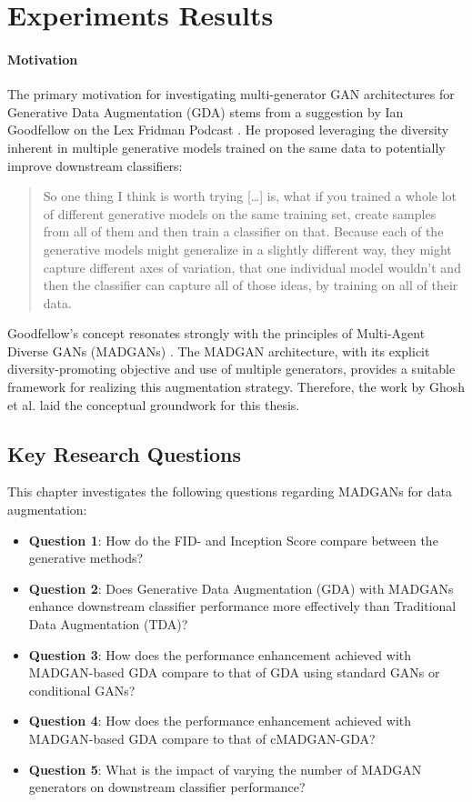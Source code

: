 \section{Experiments Results}\label{body_experiments_results}
\paragraph{Motivation}\label{exp_results_motivation}
The primary motivation for investigating multi-generator GAN architectures for Generative Data Augmentation (GDA) stems from a suggestion by Ian Goodfellow on the Lex Fridman Podcast \cite{fridman2019Goodfellow}. He proposed leveraging the diversity inherent in multiple generative models trained on the same data to potentially improve downstream classifiers:

\begin{quotation}
    \noindent So one thing I think is worth trying [\dots] is, what if you trained a whole lot of different generative models on the same training set, create samples from all of them and then train a classifier on that. Because each of the generative models might generalize in a slightly different way, they might capture different axes of variation, that one individual model wouldn't and then the classifier can capture all of those ideas, by training on all of their data.
\end{quotation}\citep[50:37]{fridman2019Goodfellow}

\noindent Goodfellow's concept resonates strongly with the principles of Multi-Agent Diverse GANs (MADGANs) \cite{ghosh2018madgan}. The MADGAN architecture, with its explicit diversity-promoting objective and use of multiple generators, provides a suitable framework for realizing this augmentation strategy. Therefore, the work by Ghosh et al. laid the conceptual groundwork for this thesis.

\subsection{Key Research Questions} \label{exp_results_research_questions}
This chapter investigates the following questions regarding MADGANs for data augmentation:
\begin{itemize}
    \item \textbf{Question 1}: How do the FID- and Inception Score compare between the generative methods?
    \item \textbf{Question 2}: Does Generative Data Augmentation (GDA) with MADGANs enhance downstream classifier performance more effectively than Traditional Data Augmentation (TDA)?
    \item \textbf{Question 3}: How does the performance enhancement achieved with MADGAN-based GDA compare to that of GDA using standard GANs or conditional GANs?
    \item \textbf{Question 4}: How does the performance enhancement achieved with MADGAN-based GDA compare to that of cMADGAN-GDA?
    \item \textbf{Question 5}: What is the impact of varying the number of MADGAN generators on downstream classifier performance? 
\end{itemize}

